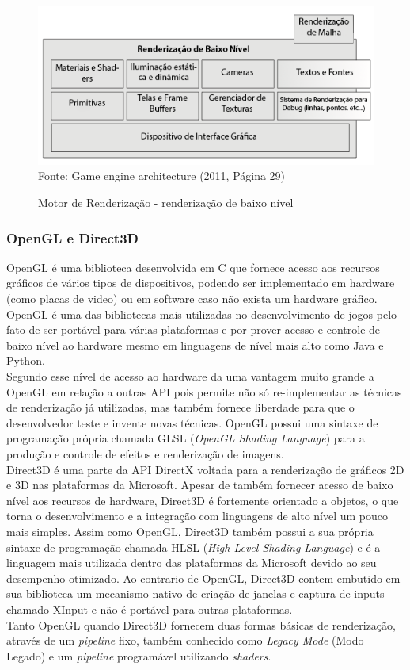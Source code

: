\documentclass[12pt,	openright, twoside,	a4paper, english, french, spanish, brazil]{abntex2}
\begin{document}
\begin{figure}[H]
\centering
\caption{Motor de Renderização - renderização de baixo nível}
\includegraphics[width=12cm]{imagens/arch-low.png}
\\
\small{Fonte: Game engine architecture (2011, Página 29)}
\label{figura:arch-low}
\end{figure}

\subsubsection{OpenGL e Direct3D}
OpenGL é uma biblioteca desenvolvida em C que fornece acesso aos recursos gráficos de vários tipos de dispositivos, podendo ser implementado em hardware (como placas de video) ou em software caso não exista um hardware gráfico. \cite{shreiner}\\
OpenGL é uma das bibliotecas mais utilizadas no desenvolvimento de jogos pelo fato de ser portável para várias plataformas e por prover acesso e controle de baixo nível ao hardware mesmo em linguagens de nível mais alto como Java e Python.\\
Segundo  esse nível de acesso ao hardware da uma vantagem muito grande a OpenGL em relação a outras API pois permite não só re-implementar as técnicas de renderização já utilizadas, mas também fornece liberdade para que o desenvolvedor teste e invente novas técnicas. OpenGL possui uma sintaxe de programação própria chamada GLSL (\textit{OpenGL Shading Language}) para a produção e controle de efeitos e renderização de imagens.
\\
Direct3D é uma parte da API DirectX voltada para a renderização de gráficos 2D e 3D nas plataformas da Microsoft. Apesar de também fornecer acesso de baixo nível aos recursos de hardware, Direct3D é fortemente orientado a objetos, o que torna o desenvolvimento e a integração com linguagens de alto nível um pouco mais simples. Assim como OpenGL, Direct3D também possui a sua própria sintaxe de programação chamada HLSL (\textit{High Level Shading Language}) e é a linguagem mais utilizada dentro das plataformas da Microsoft devido ao seu desempenho otimizado. Ao contrario de OpenGL, Direct3D contem embutido em sua biblioteca um mecanismo nativo de criação de janelas e captura de inputs chamado XInput e não é portável para outras plataformas.
\\
Tanto OpenGL quando Direct3D fornecem duas formas básicas de renderização, através de um \textit{pipeline} fixo, também conhecido como \textit{Legacy Mode} (Modo Legado) e um \textit{pipeline} programável utilizando \textit{shaders}.
\end{document}

